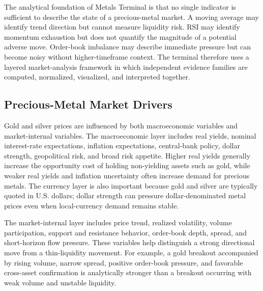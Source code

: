 \documentclass[conference]{IEEEtran}
\begin{document}
The analytical foundation of Metals Terminal is that no single indicator is
sufficient to describe the state of a precious-metal market. A moving average
may identify trend direction but cannot measure liquidity risk. RSI may
identify momentum exhaustion but does not quantify the magnitude of a
potential adverse move. Order-book imbalance may describe immediate pressure
but can become noisy without higher-timeframe context. The terminal therefore
uses a layered market-analysis framework in which independent evidence
families are computed, normalized, visualized, and interpreted together.

\subsection{Precious-Metal Market Drivers}

Gold and silver prices are influenced by both macroeconomic variables and
market-internal variables. The macroeconomic layer includes real yields,
nominal interest-rate expectations, inflation expectations, central-bank
policy, dollar strength, geopolitical risk, and broad risk appetite. Higher
real yields generally increase the opportunity cost of holding non-yielding
assets such as gold, while weaker real yields and inflation uncertainty often
increase demand for precious metals. The currency layer is also important
because gold and silver are typically quoted in U.S. dollars; dollar strength
can pressure dollar-denominated metal prices even when local-currency demand
remains stable.

The market-internal layer includes price trend, realized volatility, volume
participation, support and resistance behavior, order-book depth, spread, and
short-horizon flow pressure. These variables help distinguish a strong
directional move from a thin-liquidity movement. For example, a gold breakout
accompanied by rising volume, narrow spread, positive order-book pressure,
and favorable cross-asset confirmation is analytically stronger than a
breakout occurring with weak volume and unstable liquidity.
\end{document}
